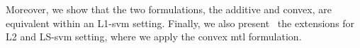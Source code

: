 Moreover, we show that the two formulations, the {additive} and {convex}, are equivalent within an L1-\acrshort{svm} setting.
%
Finally, we also present~\citet{RuizAD21} the extensions for L2 and LS-\acrshort{svm} setting, where we apply the convex \acrshort{mtl} formulation.


